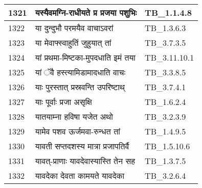 \documentclass[17pt]{extarticle}
\begin{document}
\begin{longtable}{||p{0.4in}||p{4.9in}||p{0.9in}||}
    \hline
        
    1321 & यस्यैवमग्नि{-}राधीयते प्र प्रजया पशुभिः & TB\_1.1.4.8       \\
    
    \hline
        
    1322 & या दुन्दुभौ परमयैव वाचाऽवरां & TB\_1.3.6.3       \\
    
    \hline
        
    1323 & या मेवाफ्स्वाहुतिं जुहुयात् तां & TB\_3.7.3.5       \\
    
    \hline
        
    1324 & यां प्रथमा{-}मिष्टका{-}मुपदधाति इमं तया & TB\_3.11.10.1       \\
    
    \hline
        
    1325 & यां ॅवै हस्त्यामिडामादधाति वाचः & TB\_3.3.8.5       \\
    
    \hline
        
    1326 & याः पुरस्तात् प्रस्रवन्ति उपरिष्टाथ् & TB\_3.7.4.1       \\
    
    \hline
        
    1327 & याः पूर्वाः प्रजा असृक्षि & TB\_1.6.2.4       \\
    
    \hline
        
    1328 & यातयाम्ना हविषा यजेत अथो & TB\_3.2.3.9       \\
    
    \hline
        
    1329 & यामेव पशव ऊर्जमवा{-}रुन्धत तां & TB\_1.4.9.5       \\
    
    \hline
        
    1330 & यावती सप्तदशस्य मात्रा प्रजापतिर्वै & TB\_1.5.10.6       \\
    
    \hline
        
    1331 & यावत्{-}प्राणाः यावदेवास्यास्ति तेन सह & TB\_1.3.7.5       \\
    
    \hline
        
    1332 & यावदेका देवता कामयते यावदेका & TB\_3.2.6.4       \\
    
    \hline
        

\end{longtable}
\end{document}
